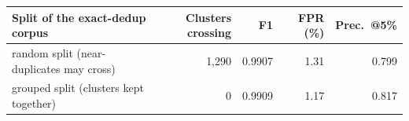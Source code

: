 \begin{tabular}{lrrrr}
\toprule
Split of the exact-dedup corpus & Clusters crossing & F1 & FPR (\%) & Prec.\ @5\% \\
\midrule
random split (near-duplicates may cross) & 1,290 & 0.9907 & 1.31 & 0.799 \\
grouped split (clusters kept together) & 0 & 0.9909 & 1.17 & 0.817 \\
\bottomrule
\end{tabular}